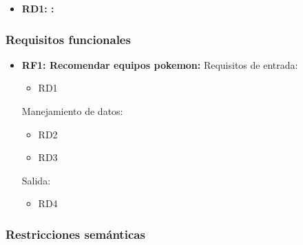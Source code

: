 
	\begin{itemize}
		\item \textbf{RD1: :}
	\end{itemize}


\subsubsection{Requisitos funcionales}

	\begin{itemize}
		\item \textbf{RF1: Recomendar equipos pokemon:}
		Requisitos de entrada:
		\begin{itemize}
			\item RD1 %
		\end{itemize}

		Manejamiento de datos:
		\begin{itemize}
			\item RD2 %
			\item RD3 %
		\end{itemize}

		Salida:
		\begin{itemize}
			\item RD4 %
		\end{itemize}
	\end{itemize}


\subsubsection{Restricciones semánticas}
